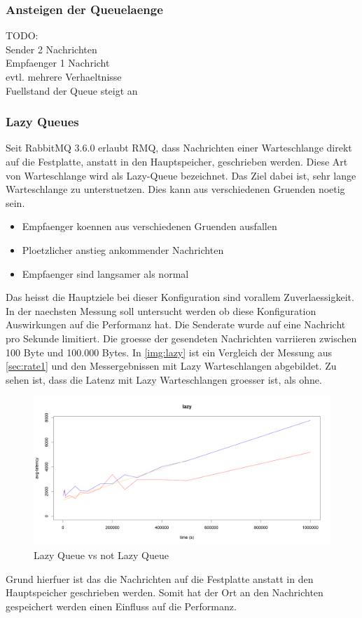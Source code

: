 \subsubsection{Ansteigen der Queuelaenge}
\label{sec:queueGrowth}
TODO: \\
Sender 2 Nachrichten \\
Empfaenger 1 Nachricht \\
evtl. mehrere Verhaeltnisse \\
Fuellstand der Queue steigt an \\

\subsubsection{Lazy Queues}
\label{sec:rmqLazy}
Seit RabbitMQ 3.6.0 erlaubt RMQ, dass Nachrichten einer Warteschlange direkt auf die Festplatte, anstatt in den Hauptspeicher, geschrieben werden. Diese Art von Warteschlange wird als Lazy-Queue bezeichnet. Das Ziel dabei ist, sehr lange Warteschlange zu unterstuetzen. Dies kann aus verschiedenen Gruenden noetig sein. 
\begin{itemize}
    \item Empfaenger koennen aus verschiedenen Gruenden ausfallen
    \item Ploetzlicher anstieg ankommender Nachrichten
    \item Empfaenger sind langsamer als normal
\end{itemize}
Das heisst die Hauptziele bei dieser Konfiguration sind vorallem Zuverlaessigkeit. In der naechsten Messung soll untersucht werden ob diese Konfiguration Auswirkungen auf die Performanz hat. Die Senderate wurde auf eine Nachricht pro Sekunde limitiert. Die groesse der gesendeten Nachrichten varriieren zwischen 100 Byte und 100.000 Bytes.
In \autoref{img:lazy} ist ein Vergleich der Messung aus \autoref{sec:rate1} und den Messergebnissen mit Lazy Warteschlangen abgebildet. Zu sehen ist, dass die Latenz mit Lazy Warteschlangen groesser ist, als ohne.
\begin{figure}
\center
  \includegraphics[width=1\textwidth]{images/measurement/lazy-queues.png}
  \caption{Lazy Queue vs not Lazy Queue}
  \label{img:lazy}
\end{figure}
Grund hierfuer ist das die Nachrichten auf die Festplatte anstatt in den Hauptspeicher geschrieben werden. Somit hat der Ort an den Nachrichten gespeichert werden einen Einfluss auf die Performanz.



